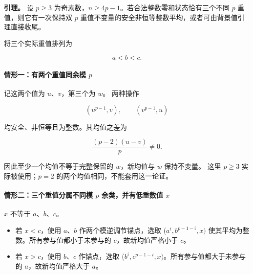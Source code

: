 \textbf{{引理。}} {设} {\ensuremath{p\ge 3}} {为奇素数，\ensuremath{n\ge 4p-1}。若合法整数零和状态恰有三个不同} {\ensuremath{p}} {重值，则它有一次保持双} {\ensuremath{p}} {重值不变量的安全非恒等整数平均，或者可由背景值引理直接收尾。}

{将三个实际重值排列为}

\[
a<b<c.
\]

\paragraph*{\texorpdfstring{{情形一：有两个重值同余模} {\ensuremath{p}}}{情形一：有两个重值同余模 }}\label{C3-h14}

{记这两个值为} {\ensuremath{u}、\ensuremath{v}，第三个为} {\ensuremath{w}。} {两种操作}

\[
(u^{p-1},v),\qquad(v^{p-1},u)
\]

{均安全、非恒等且为整数。其均值之差为}

\[
\frac{(p-2)(u-v)}p\ne0.
\]

{因此至少一个均值不等于完整保留的} {\ensuremath{w}，新均值与} {\ensuremath{w}} {保持不变量。} {这里} {\ensuremath{p\ge 3}} {实际被使用；\ensuremath{p=2}} {的两个均值相同，不能套用这一论证。}

\paragraph*{\texorpdfstring{{情形二：三个重值分属不同模} {\ensuremath{p}} {余类，并有低重数值} {\ensuremath{x}}}{情形二：三个重值分属不同模  余类，并有低重数值 }}\label{C3-h15}

{\ensuremath{x}} {不等于} {\ensuremath{a}、\ensuremath{b}、\ensuremath{c}。}

\begin{itemize}
\tightlist
\item
  {若} {\ensuremath{x<c}，使用} {\ensuremath{a}、\ensuremath{b}} {作两个模逆调节锚点，选取} {(\ensuremath{a^{i},b^{p-1-i},x)}} {使其平均为整数。所有参与值都小于未参与的} {\ensuremath{c}，故新均值严格小于} {\ensuremath{c}。}
\item
  {若} {\ensuremath{x>c}，使用} {\ensuremath{b}、\ensuremath{c}} {作锚点，选取} {(\ensuremath{b^{i},c^{p-1-i},x)}。所有参与值都大于未参与的} {\ensuremath{a}，故新均值严格大于} {\ensuremath{a}。}
\end{itemize}

